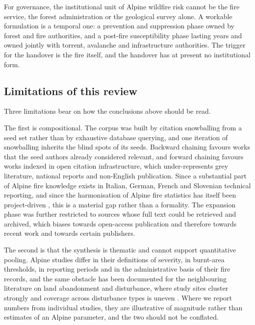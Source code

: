 \documentclass[11pt,a4paper]{article}
\begin{document}
For governance, the institutional unit of Alpine wildfire risk cannot be the fire service, the forest administration or the geological survey alone. A workable formulation is a temporal one: a prevention and suppression phase owned by forest and fire authorities, and a post-fire susceptibility phase lasting years and owned jointly with torrent, avalanche and infrastructure authorities. The trigger for the handover is the fire itself, and the handover has at present no institutional form.

\subsection{Limitations of this review}

Three limitations bear on how the conclusions above should be read.

The first is compositional. The corpus was built by citation snowballing from a seed set rather than by exhaustive database querying, and one iteration of snowballing inherits the blind spots of its seeds. Backward chaining favours works that the seed authors already considered relevant, and forward chaining favours works indexed in open citation infrastructure, which under-represents grey literature, national reports and non-English publication. Since a substantial part of Alpine fire knowledge exists in Italian, German, French and Slovenian technical reporting, and since the harmonisation of Alpine fire statistics has itself been project-driven \citep{valese_wildfires_2011, muller_forest_2020}, this is a material gap rather than a formality. The expansion phase was further restricted to sources whose full text could be retrieved and archived, which biases towards open-access publication and therefore towards recent work and towards certain publishers.

The second is that the synthesis is thematic and cannot support quantitative pooling. Alpine studies differ in their definitions of severity, in burnt-area thresholds, in reporting periods and in the administrative basis of their fire records, and the same obstacle has been documented for the neighbouring literature on land abandonment and disturbance, where study sites cluster strongly and coverage across disturbance types is uneven \citep{mantero_influence_2020}. Where we report numbers from individual studies, they are illustrative of magnitude rather than estimates of an Alpine parameter, and the two should not be conflated.
\end{document}
